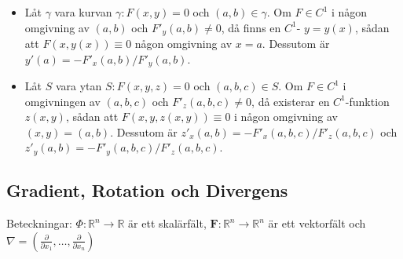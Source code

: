 \documentclass{article}
\newcommand\dd[2]{\frac{\partial #1}{\partial #2}}
\newcommand\bdF{\mathbf F}
\def\Rone{{\mathbb R}}
\begin{document}
\begin{itemize}

\item %
     {Låt}
$\gamma$ 
   {vara kurvan}
 $\gamma:F(x,y)=0$
    {och}
$(a,b)\in\gamma$.
   {Om}
$F\in C^1$
   {i någon omgivning av}
$(a,b)$
   {och}
$F'_y(a,b)\neq0$,
   {då finns en}
$C^1$-
$y=y(x)$,
   {sådan att}
$F(x,y(x))\equiv0$
   {någon omgivning av}
$x=a$.
   {Dessutom är}
$y'(a)=-F'_x(a,b)/F'_y(a,b)$.


\item %
     {Låt $S$ vara ytan $S\!:\!F(x,y,z)=0$ och $(a,b,c)\in S$.}
     {Om}
$F\in C^1$
   {i omgivningen av}
$(a,b,c)$
   {och}
$F'_z(a,b,c)\neq0$,
   {då existerar en $C^1$-funktion $z(x,y)$, sådan att}
$F(x,y,z(x,y))\equiv0$ 
   {i någon omgivning av $(x,y)=(a,b)$. Dessutom är}
$z'_x(a,b)=-F'_x(a,b,c)/F'_z(a,b,c)$ 
   {och}
$z'_y(a,b)=-F'_y(a,b,c)/F'_z(a,b,c)$.%

\end{itemize}

\subsection*{
   {Gradient, Rotation och Divergens}
}

   {Beteckningar:}
  $\Phi:\Rone^n\to\Rone$
     {är ett skalärfält},
  $\bdF:\Rone^n\to\Rone^n$
     {är ett vektorfält}
   {och}
  $\nabla=\textstyle(\dd{}{x_1},\ldots,\dd{}{x_n})$
\end{document}
